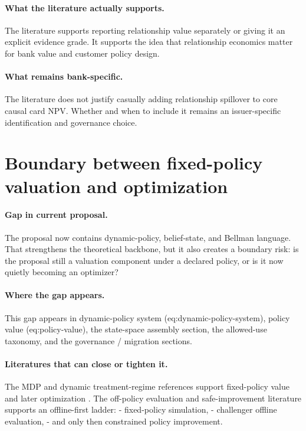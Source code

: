 \documentclass[11pt]{article}
\begin{document}
\paragraph{What the literature actually supports.}
The literature supports reporting relationship value separately or giving it an
explicit evidence grade. It supports the idea that relationship economics matter
for bank value and customer policy design.

\paragraph{What remains bank-specific.}
The literature does not justify casually adding relationship spillover to core
causal card NPV. Whether and when to include it remains an issuer-specific
identification and governance choice.

\section{Boundary between fixed-policy valuation and optimization}

\paragraph{Gap in current proposal.}
The proposal now contains dynamic-policy, belief-state, and Bellman language.
That strengthens the theoretical backbone, but it also creates a boundary risk:
is the proposal still a valuation component under a declared policy, or is it now
quietly becoming an optimizer?

\paragraph{Where the gap appears.}
This gap appears in dynamic-policy system (eq:dynamic-policy-system),
policy value (eq:policy-value), the state-space assembly section, the
allowed-use taxonomy, and the governance / migration sections.

\paragraph{Literatures that can close or tighten it.}
The MDP and dynamic treatment-regime references support fixed-policy value and
later optimization \citep{puterman1994mdp,murphy2003dynamic}. The off-policy
evaluation and safe-improvement literature
\citep{jiangli2016dr,huwager2021pomdpope,laroche2019spibb,
khraishiokhrati2022offlinecredit} supports an offline-first ladder:
- fixed-policy simulation,
- challenger offline evaluation,
- and only then constrained policy improvement.
\end{document}
